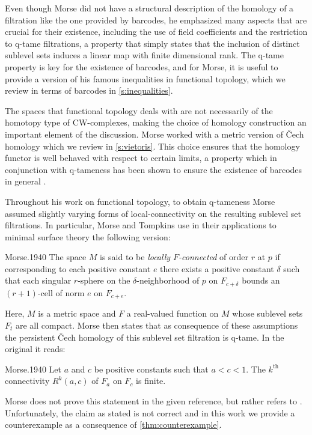 Even though Morse did not have a structural description of the homology of a filtration like the one provided by barcodes, he emphasized many aspects that are crucial for their existence, including the use of field coefficients and the restriction to q-tame filtrations, a property that simply states that the inclusion of distinct sublevel sets induces a linear map with finite dimensional rank.
The q-tame property is key for the existence of barcodes, and for Morse, it is useful to provide a version of his famous inequalities in functional topology, which we review in terms of barcodes in \cref{s:inequalities}.

The spaces that functional topology deals with are not necessarily of the homotopy type of CW-complexes, making the choice of homology construction an important element of the discussion.
Morse worked with a metric version of \v{C}ech homology which we review in \cref{s:vietoris}.
This choice ensures that the homology functor is well behaved with respect to certain limits, a property which in conjunction with q-tameness has been shown to ensure the existence of barcodes in general \cite{schmahl2020structure}.

Throughout his work on functional topology, to obtain q-tameness Morse assumed slightly varying forms of local-connectivity on the resulting sublevel set filtrations.
In particular, Morse and Tompkins use in their applications to minimal surface theory the following version:
\begin{displaycquote}[p.431]{Morse.1940}
	The space $M$ is said to be \textit{locally $F$-connected} of order $r$ at $p$ if corresponding to each positive constant $e$ there exists a positive constant $\delta$ such that each singular $r$-sphere on the $\delta$-neighborhood of $p$ on $F_{c+\delta}$ bounds an $(r+1)$-cell of norm $e$ on $F_{c+e}$.
\end{displaycquote}
Here, $M$ is a metric space and $F$ a real-valued function on $M$ whose sublevel sets $F_{t}$ are all compact.
Morse then states that as consequence of these assumptions the persistent \v{C}ech homology of this sublevel set filtration is q-tame.
In the original it reads:
\begin{displaycquote}[Theorem 6.3, p.432]{Morse.1940}
	Let $a$ and $c$ be positive constants such that $a < c < 1$.
	The $k^{\mathrm{th}}$ connectivity $R^k(a,c)$ of $F_a$ on $F_c$ is finite.
\end{displaycquote}
Morse does not prove this statement in the given reference, but rather refers to \cite[Theorem 6.1]{Morse.1938}.
Unfortunately, the claim as stated is not correct and in this work we provide a counterexample as a consequence of \cref{thm:counterexample}.

